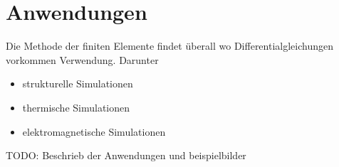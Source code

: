 %
%
%
%
\section{Anwendungen\label{fem:section:anwendungen}}

Die Methode der finiten Elemente findet überall wo Differentialgleichungen vorkommen Verwendung.
Darunter
\begin{itemize}
    \item strukturelle Simulationen
    \item thermische Simulationen
    \item elektromagnetische Simulationen
\end{itemize}

TODO: Beschrieb der Anwendungen und beispielbilder